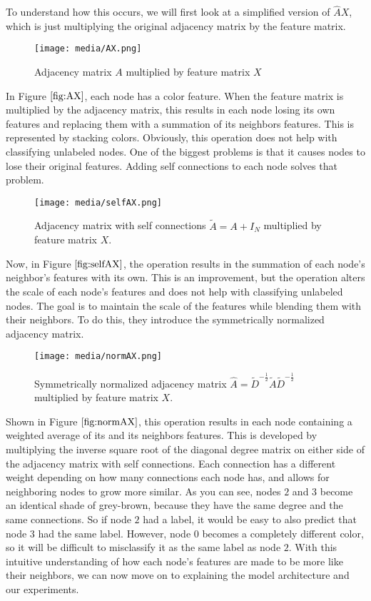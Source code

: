 To understand how this occurs, we will first look at a simplified version of $\hat{A}X$, which is just multiplying the original adjacency matrix by the feature matrix.  


\begin{figure}[h]
	\centering
	\texttt{[image: media/AX.png]}
	\caption{Adjacency matrix $A$ multiplied by feature matrix $X$} 
	\label{fig:AX}
\end{figure}


In Figure $\ref{fig:AX}$, each node has a color feature. When the feature matrix is multiplied by the adjacency matrix, this results in each node losing its own features and replacing them with a summation of its neighbors features. This is represented by stacking colors. Obviously, this operation does not help with classifying unlabeled nodes. One of the biggest problems is that it causes nodes to lose their original features. Adding self connections to each node solves that problem.


\begin{figure}[h]
	\centering
	\texttt{[image: media/selfAX.png]}
	\caption{Adjacency matrix with self connections $\tilde{A} = A + I_N$ multiplied by feature matrix $X$.} 
	\label{fig:selfAX}
\end{figure}


Now, in Figure $\ref{fig:selfAX}$, the operation results in the summation of each node's neighbor's features with its own. This is an improvement, but the operation alters the scale of each node's features and does not help with classifying unlabeled nodes. The goal is to maintain the scale of the features while blending them with their neighbors. To do this, they introduce the symmetrically normalized adjacency matrix.


\begin{figure}[h]
	\centering
	\texttt{[image: media/normAX.png]}
	\caption{Symmetrically normalized adjacency matrix $\hat{A} = \tilde{D}^{-\frac{1}{2}}\tilde{A}\tilde{D}^{-\frac{1}{2}}$ multiplied by feature matrix $X$.} 
	\label{fig:normAX}
\end{figure}


Shown in Figure $\ref{fig:normAX}$, this operation results in each node containing a weighted average of its and its neighbors features. This is developed by multiplying the inverse square root of the diagonal degree matrix on either side of the adjacency matrix with self connections. Each connection has a different weight depending on how many connections each node has, and allows for neighboring nodes to grow more similar. As you can see, nodes $2$ and $3$ become an identical shade of grey-brown, because they have the same degree and the same connections. So if node $2$ had a label, it would be easy to also predict that node $3$ had the same label. However, node $0$ becomes a completely different color, so it will be difficult to misclassify it as the same label as node $2$. With this intuitive understanding of how each node's features are made to be more like their neighbors, we can now move on to explaining the model architecture and our experiments.